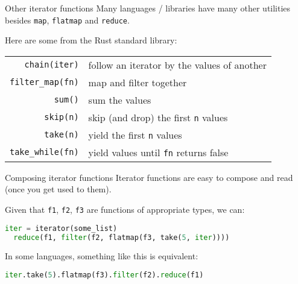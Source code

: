\documentclass[../index.tex]{subfiles}
\begin{document}
\renewcommand{\currenttitle}{Other iterator functions}
\begin{frame}[fragile]{\currenttitle}
  Many languages / libraries have many other utilities besides \texttt{map},
  \texttt{flatmap} and \texttt{reduce}.

  Here are some from the Rust standard library: \\[3em]

  \begin{center}
    \begin{tabular}{ r l }
      \texttt{chain(iter)}      & follow an iterator by the values of another   \\
      \texttt{filter\_map(fn)}  & map and filter together                       \\
      \texttt{sum()}            & sum the values                                \\
      \texttt{skip(n)}          & skip (and drop) the first \texttt{n} values   \\
      \texttt{take(n)}          & yield the first \texttt{n} values             \\
      \texttt{take\_while(fn)}  & yield values until \texttt{fn} returns false  \\
    \end{tabular}
  \end{center}

\end{frame}

\renewcommand{\currenttitle}{Composing iterator functions}
\begin{frame}[fragile]{\currenttitle}
  Iterator functions are easy to compose and read (once you get used to them).

  Given that \texttt{f1}, \texttt{f2}, \texttt{f3} are functions of appropriate
  types, we can:

  \begin{lstlisting}[language=Python]
  iter = iterator(some_list)
  reduce(f1, filter(f2, flatmap(f3, take(5, iter))))
  \end{lstlisting}

  In some languages, something like this is equivalent:

  \begin{lstlisting}[language=Python]
  iter.take(5).flatmap(f3).filter(f2).reduce(f1)
  \end{lstlisting}

\end{frame}
\end{document}
